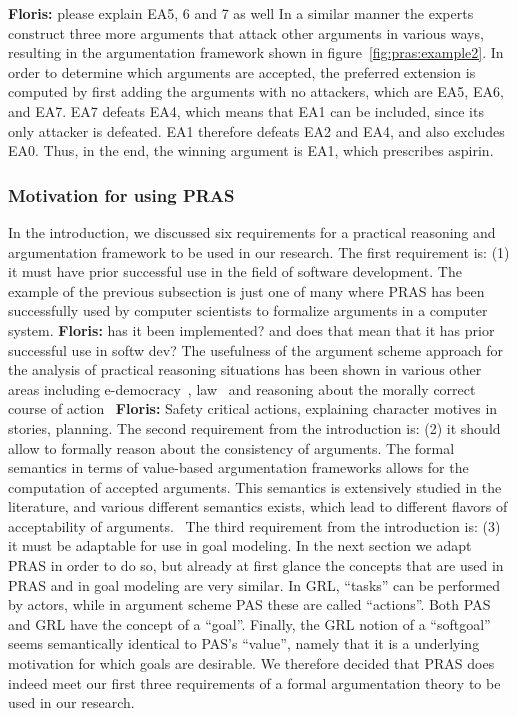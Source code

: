 \documentclass[11.5pt,two column]{llncs}
\newcommand{\floris}[1]{{\color{red}\textbf{Floris: }#1}}
\begin{document}
\floris{please explain EA5, 6 and 7 as well}
In a similar manner the experts construct three more arguments that attack other arguments in various ways, resulting in the argumentation framework shown in figure~\ref{fig:pras:example2}. In order to determine which arguments are accepted, the preferred extension is computed by first adding the arguments with no attackers, which are EA5, EA6, and EA7. EA7 defeats EA4, which means that EA1 can be included, since its only attacker is defeated. EA1 therefore defeats EA2 and EA4, and also excludes EA0. Thus, in the end, the winning argument is EA1, which prescribes aspirin. 

\subsubsection{Motivation for using PRAS}
\label{sect:background:pras:motivation}

In the introduction, we discussed six requirements for a practical reasoning and argumentation framework to be used in our research. The first requirement is: (1) it must have prior successful use in the field of software development. The example of the previous subsection is just one of many where PRAS has been successfully used by computer scientists to formalize arguments in a computer system. \floris{has it been implemented? and does that mean that it has prior successful use in softw dev?} The usefulness of the argument scheme approach for the analysis of practical reasoning situations has been shown in various other areas including e-democracy~\cite{Atkinson2006}, law~\cite{bench2005persuasion} and reasoning about the morally correct course of action~\cite{bench2006automating} \floris{Safety critical actions, explaining character motives in stories, planning}. The second requirement from the introduction is: (2) it should allow to formally reason about the consistency of arguments. The formal semantics in terms of value-based argumentation frameworks allows for the computation of accepted arguments. This semantics is extensively studied in the literature, and various different semantics exists, which lead to different flavors of acceptability of arguments.~\cite{} The third requirement from the introduction is: (3) it must be adaptable for use in goal modeling. In the next section we adapt PRAS in order to do so, but already at first glance the concepts that are used in PRAS and in goal modeling are very similar. In GRL, ``tasks'' can be performed by actors, while in argument scheme PAS these are called ``actions''. Both PAS and GRL have the concept of a ``goal''. Finally, the GRL notion of a ``softgoal'' seems semantically identical to PAS's ``value'', namely that it is a underlying motivation for which goals are desirable. We therefore decided that PRAS does indeed meet our first three requirements of a formal argumentation theory to be used in our research.
\end{document}
